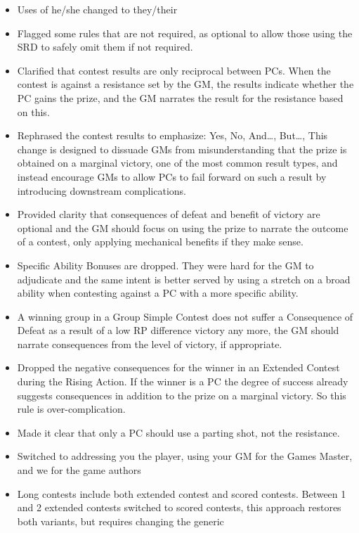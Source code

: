 \documentclass[
]{article}
\providecommand{\tightlist}{%
  \setlength{\itemsep}{0pt}\setlength{\parskip}{0pt}}
\begin{document}
\begin{itemize}
\tightlist
\item
  Uses of he/she changed to they/their
\item
  Flagged some rules that are not required, as optional to allow those
  using the SRD to safely omit them if not required.
\item
  Clarified that contest results are only reciprocal between PCs. When
  the contest is against a resistance set by the GM, the results
  indicate whether the PC gains the prize, and the GM narrates the
  result for the resistance based on this.
\item
  Rephrased the contest results to emphasize: Yes, No, And\ldots,
  But\ldots, This change is designed to dissuade GMs from
  misunderstanding that the prize is obtained on a marginal victory, one
  of the most common result types, and instead encourage GMs to allow
  PCs to fail forward on such a result by introducing downstream
  complications.
\item
  Provided clarity that consequences of defeat and benefit of victory
  are optional and the GM should focus on using the prize to narrate the
  outcome of a contest, only applying mechanical benefits if they make
  sense.
\item
  Specific Ability Bonuses are dropped. They were hard for the GM to
  adjudicate and the same intent is better served by using a stretch on
  a broad ability when contesting against a PC with a more specific
  ability.
\item
  A winning group in a Group Simple Contest does not suffer a
  Consequence of Defeat as a result of a low RP difference victory any
  more, the GM should narrate consequences from the level of victory, if
  appropriate.
\item
  Dropped the negative consequences for the winner in an Extended
  Contest during the Rising Action. If the winner is a PC the degree of
  success already suggests consequences in addition to the prize on a
  marginal victory. So this rule is over-complication.
\item
  Made it clear that only a PC should use a parting shot, not the
  resistance.
\item
  Switched to addressing you the player, using your GM for the Games
  Master, and we for the game authors
\item
  Long contests include both extended contest and scored contests.
  Between 1 and 2 extended contests switched to scored contests, this
  approach restores both variants, but requires changing the generic

\end{itemize}
\end{document}
